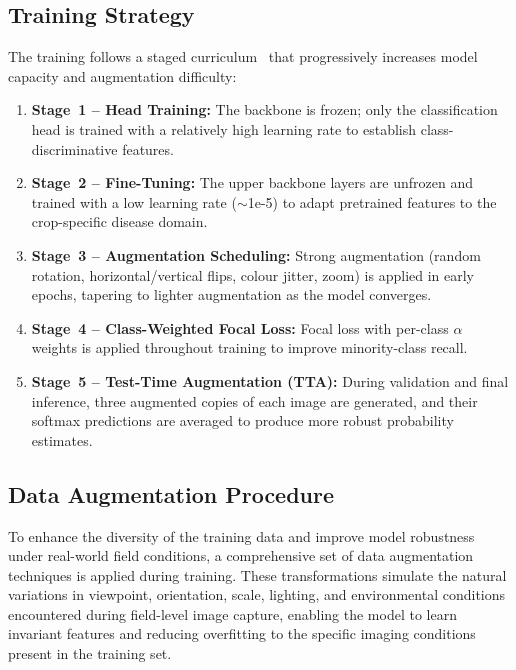 \documentclass[12pt,a4paper]{report}
\begin{document}
\subsection{Training Strategy}
The training follows a staged curriculum~\cite{b23} that progressively increases model capacity and augmentation difficulty:

\begin{enumerate}
    \item \textbf{Stage~1 -- Head Training:} The backbone is frozen; only the classification head is trained with a relatively high learning rate to establish class-discriminative features.
    \item \textbf{Stage~2 -- Fine-Tuning:} The upper backbone layers are unfrozen and trained with a low learning rate ($\sim$1e-5) to adapt pretrained features to the crop-specific disease domain.
    \item \textbf{Stage~3 -- Augmentation Scheduling:} Strong augmentation (random rotation, horizontal/vertical flips, colour jitter, zoom) is applied in early epochs, tapering to lighter augmentation as the model converges.
    \item \textbf{Stage~4 -- Class-Weighted Focal Loss:} Focal loss with per-class $\alpha$ weights is applied throughout training to improve minority-class recall.
    \item \textbf{Stage~5 -- Test-Time Augmentation (TTA):} During validation and final inference, three augmented copies of each image are generated, and their softmax predictions are averaged to produce more robust probability estimates.
\end{enumerate}

\subsection{Data Augmentation Procedure}
To enhance the diversity of the training data and improve model robustness under real-world field conditions, a comprehensive set of data augmentation techniques is applied during training. These transformations simulate the natural variations in viewpoint, orientation, scale, lighting, and environmental conditions encountered during field-level image capture, enabling the model to learn invariant features and reducing overfitting to the specific imaging conditions present in the training set.
\end{document}
